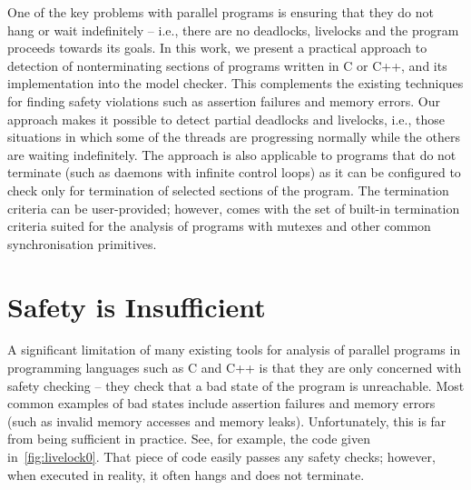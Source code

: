 
One of the key problems with parallel programs is ensuring that they do not hang or wait indefinitely -- i.e., there are no deadlocks, livelocks and the program proceeds towards its goals.
In this work, we present a practical approach to detection of nonterminating sections of programs written in C or C++, and its implementation into the \divine model checker.
This complements the existing techniques for finding safety violations such as assertion failures and memory errors.
Our approach makes it possible to detect partial deadlocks and livelocks, i.e., those situations in which some of the threads are progressing normally while the others are waiting indefinitely.
The approach is also applicable to programs that do not terminate (such as daemons with infinite control loops) as it can be configured to check only for termination of selected sections of the program.
The termination criteria can be user-provided; however, \divine comes with the set of built-in termination criteria suited for the analysis of programs with mutexes and other common synchronisation primitives.

\section{Safety is Insufficient}

A significant limitation of many existing tools for analysis of parallel
programs in programming languages such as C and C++ is that they are only concerned with safety checking -- they check that a bad state of the program is unreachable.
Most common examples of bad states include assertion failures and memory errors (such as invalid memory accesses and memory leaks).
Unfortunately, this is far from being sufficient in practice.
See, for example, the code given in~\autoref{fig:livelock0}.
That piece of code easily passes any safety checks; however, when executed in reality, it often hangs and does not terminate.

